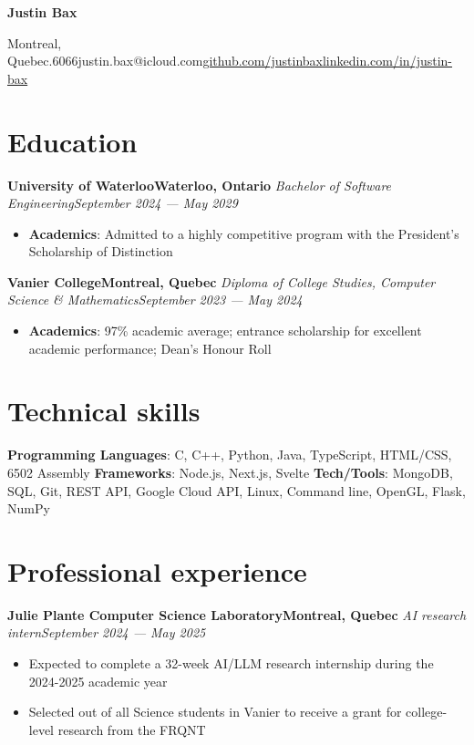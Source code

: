 \documentclass{article}
\newcommand{\cdelim}{\;\textbar\;}
\newcommand{\newrole}[4]{
    {\normalfont\bfseries #1\hfill#3}
    \newline
    \textit{#2}\hfill\textit{#4}
}
\newenvironment{bulletpoints}{\begin{itemize}\setlength\itemsep{-0.3em}}{\end{itemize}}
\begin{document}
\begin{center}
    {\Huge\bfseries Justin Bax}\\\vspace*{2pt}

    Montreal, Quebec\cdelim 438.763.6066\cdelim justin.bax@icloud.com\cdelim\href{https://github.com/justinbax}{github.com/justinbax}\cdelim\href{https://linkedin.com/in/justin-bax}{linkedin.com/in/justin-bax}\\
\end{center}

\section*{Education}

\newrole{University of Waterloo}{Bachelor of Software Engineering}{Waterloo, Ontario}{September 2024 --- May 2029}
\begin{bulletpoints}
    \item {\bfseries Academics}: Admitted to a highly competitive program with the President's Scholarship of Distinction
\end{bulletpoints}

\newrole{Vanier College}{Diploma of College Studies, Computer Science \& Mathematics}{Montreal, Quebec}{September 2023 --- May 2024}
\begin{bulletpoints}
    \item {\bfseries Academics}: 97\% academic average; entrance scholarship for excellent academic performance; Dean's Honour Roll
\end{bulletpoints}


\section*{Technical skills}

{\bfseries Programming Languages}: C, C++, Python, Java, TypeScript, HTML/CSS, 6502 Assembly
\newline
{\bfseries Frameworks}: Node.js, Next.js, Svelte
\newline
{\bfseries Tech/Tools}: MongoDB, SQL, Git, REST API, Google Cloud API, Linux, Command line, OpenGL, Flask, NumPy


\section*{Professional experience}

\newrole{Julie Plante Computer Science Laboratory}{AI research intern}{Montreal, Quebec}{September 2024 --- May 2025}
\begin{bulletpoints}
    \item Expected to complete a 32-week AI/LLM research internship during the 2024-2025 academic year
    \item Selected out of all Science students in Vanier to receive a grant for college-level research from the FRQNT
\end{bulletpoints}
\end{document}
